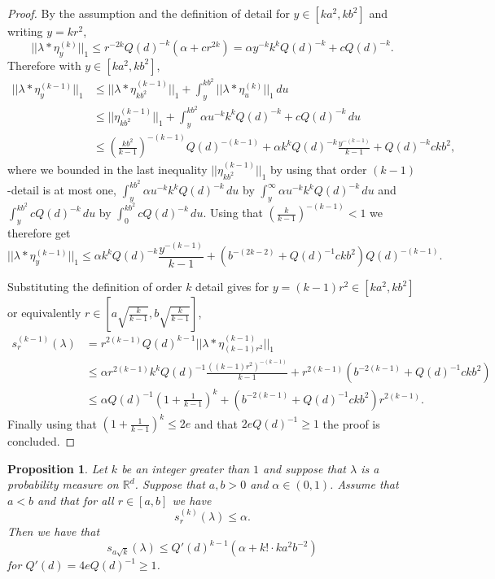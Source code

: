 \documentclass[10pt, english,oneside,reqno]{amsart}
\theoremstyle{plain}
\newtheorem{proposition}[theorem]{Proposition}
\theoremstyle{remark}
\numberwithin{equation}{section}
\numberwithin{figure}{section}
\newcommand{\R}{\mathbb{R}}
\begin{document}
\begin{proof}
    By the assumption and the definition of detail for $y \in [ka^2, kb^2]$ and writing $y = kr^2$, $$||\lambda * \eta_{y}^{(k)}||_1 \leq r^{-2k}Q(d)^{-k}(\alpha + cr^{2k}) = \alpha y^{-k}k^k Q(d)^{-k} + cQ(d)^{-k}.$$ Therefore with $y \in [ka^2, kb^2]$, 
    \begin{align*}
        ||\lambda * \eta^{(k-1)}_y||_1 &\leq ||\lambda * \eta^{(k-1)}_{kb^2}||_1 + \int_y^{kb^2} ||\lambda * \eta^{(k)}_u||_1 \, du \\
        &\leq ||\eta^{(k-1)}_{kb^2}||_1 + \int_y^{kb^2} \alpha u^{-k}k^k Q(d)^{-k} + cQ(d)^{-k} \, du \\
        &\leq (\tfrac{kb^2}{k-1})^{-(k - 1)} Q(d)^{-(k-1)} + \alpha k^k Q(d)^{-k} \tfrac{y^{-(k - 1)}}{k-1} +  Q(d)^{-k}c k b^2 ,
    \end{align*} where we bounded in the last inequality $||\eta^{(k-1)}_{kb^2}||_1$ by using that order $(k-1)$-detail is at most one, $\int_y^{kb^2} \alpha u^{-k}k^k Q(d)^{-k} \, du$ by $\int_y^{\infty} \alpha u^{-k}k^k Q(d)^{-k} \, du$ and $\int_y^{kb^2}  cQ(d)^{-k} \, du$ by $\int_0^{kb^2} cQ(d)^{-k} \, du$. Using that $(\tfrac{k}{k-1})^{-(k - 1)} < 1$ we therefore get 
    $$||\lambda * \eta^{(k-1)}_y||_1  \leq \alpha k^k Q(d)^{-k} \frac{y^{-(k - 1)}}{k-1} + (b^{-(2k-2)} + Q(d)^{-1}ckb^2)Q(d)^{-(k-1)}.$$

    Substituting the definition of order $k$ detail gives for $y = (k-1) r^2 \in [ka^2, kb^2]$ or equivalently  $r \in \left[ a\sqrt{\frac{k}{k-1}}, b \sqrt{\frac{k}{k-1}}  \right]$,
    \begin{align*}
    s_r^{(k-1)}(\lambda) &= r^{2(k-1)}Q(d)^{k-1}||\lambda * \eta^{(k-1)}_{(k-1)r^2}||_1 \\
    &\leq \alpha r^{2(k-1)} k^k Q(d)^{-1} \frac{((k-1)r^2)^{-(k - 1)}}{k-1} +r^{2(k-1)}(b^{-2(k-1)} + Q(d)^{-1}ckb^2) \\
    &\leq \alpha Q(d)^{-1}\left( 1 + \frac{1}{k-1}  \right)^k + (b^{-2(k-1)} + Q(d)^{-1}ckb^2)r^{2(k-1)}.
    \end{align*} Finally using that $\left( 1 + \frac{1}{k-1}  \right)^k \leq 2e$ and that $2eQ(d)^{-1} \geq 1$ the proof is concluded.
\end{proof}

\begin{proposition}\label{kto1DetailBound}
    Let $k$ be an integer greater than $1$ and suppose that $\lambda$ is a probability measure on $\R^d$. Suppose that $a, b > 0$ and $\alpha \in (0,1)$. Assume that $a < b$ and that for all $r \in [a,b]$ we have $$s_r^{(k)}(\lambda) \leq \alpha.$$ Then we have that $$s_{a\sqrt{k}}(\lambda) \leq Q'(d)^{k-1}(\alpha + k! \cdot k a^2b^{-2})$$ for $Q'(d) = 4eQ(d)^{-1} \geq 1$.
\end{proposition}
\end{document}
